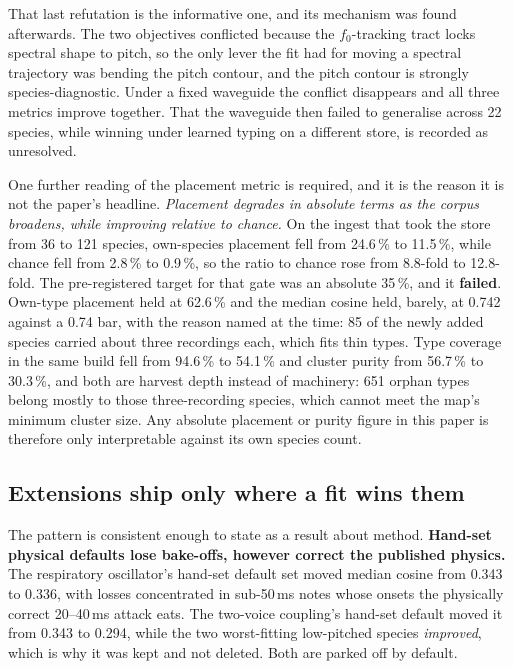 \documentclass[10pt,twocolumn,a4paper]{article}
\begin{document}
That last refutation is the informative one, and its mechanism was found afterwards. The two
objectives conflicted because the $f_0$-tracking tract locks spectral shape to pitch, so the
only lever the fit had for moving a spectral trajectory was bending the pitch contour, and
the pitch contour is strongly species-diagnostic. Under a fixed waveguide the conflict
disappears and all three metrics improve together. That the waveguide then failed to
generalise across 22 species, while winning under learned typing on a different store, is
recorded as unresolved.

One further reading of the placement metric is required, and it is the reason it is not the
paper's headline. \emph{Placement degrades in absolute terms as the corpus broadens, while
improving relative to chance.} On the ingest that took the store from 36 to 121 species, own-species
placement fell from 24.6\,\% to 11.5\,\%, while chance fell from 2.8\,\% to 0.9\,\%, so the
ratio to chance rose from 8.8-fold to 12.8-fold. The pre-registered target for that gate was an
absolute 35\,\%, and it \textbf{failed}. Own-type placement held at 62.6\,\% and the median cosine
held, barely, at 0.742 against a 0.74 bar, with the reason named at the time: 85 of the newly
added species carried about three recordings each, which fits thin types. Type coverage in the
same build fell from 94.6\,\% to 54.1\,\% and cluster purity from 56.7\,\% to 30.3\,\%, and
both are harvest depth instead of machinery: 651 orphan types belong mostly to those
three-recording species, which cannot meet the map's minimum cluster size. Any absolute
placement or purity figure in this paper is therefore only interpretable against its own
species count.

\subsection{Extensions ship only where a fit wins them}

The pattern is consistent enough to state as a result about method. \textbf{Hand-set
physical defaults lose bake-offs, however correct the published physics.} The respiratory
oscillator's hand-set default set moved median cosine from 0.343 to 0.336, with losses
concentrated in sub-50\,ms notes whose onsets the physically correct 20--40\,ms attack eats.
The two-voice coupling's hand-set default moved it from 0.343 to 0.294, while the two
worst-fitting low-pitched species \emph{improved}, which is why it was kept and not deleted. Both are parked off by default.
\end{document}
